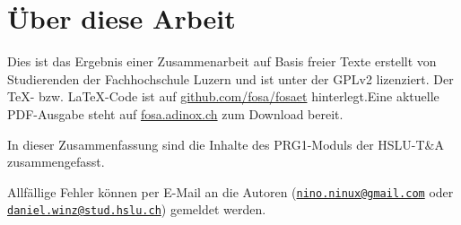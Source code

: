 



\section*{Über diese Arbeit}
Dies ist das Ergebnis einer Zusammenarbeit auf Basis freier Texte erstellt von 
Studierenden der Fachhochschule Luzern und ist unter der GPLv2 lizenziert. Der 
\TeX - bzw. \LaTeX -Code ist auf \url{github.com/fosa/fosaet} hinterlegt.Eine 
aktuelle PDF-Ausgabe steht auf \url{fosa.adinox.ch} zum Download bereit.

In dieser Zusammenfassung sind die Inhalte des PRG1-Moduls der HSLU-T\&A zusammengefasst. 

Allfällige Fehler können per E-Mail an die Autoren 
(\href{mailto:nino.ninux@gmail.com}{\nolinkurl{nino.ninux@gmail.com}} oder 
\href{mailto:daniel.winz@stud.hslu.ch}{\nolinkurl{daniel.winz@stud.hslu.ch}}) 
gemeldet werden. 

